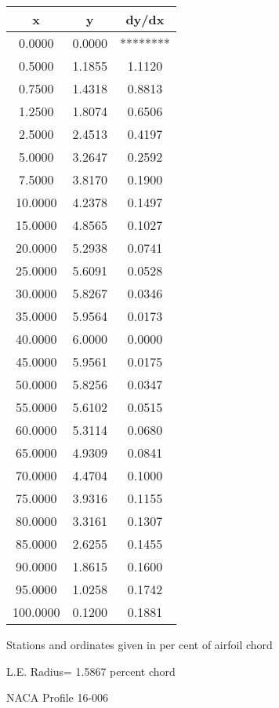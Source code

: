 \documentclass[11pt]{book}
\begin{document}
 \vspace{8mm}
 \begin{tabular}{|c|c|c|} \hline 
  x  &  y  &  dy/dx \\
 \hline
0.0000 & 0.0000 & ******** \\
0.5000 & 1.1855 & 1.1120 \\
0.7500 & 1.4318 & 0.8813 \\
1.2500 & 1.8074 & 0.6506 \\
2.5000 & 2.4513 & 0.4197 \\
5.0000 & 3.2647 & 0.2592 \\
7.5000 & 3.8170 & 0.1900 \\
10.0000 & 4.2378 & 0.1497 \\
15.0000 & 4.8565 & 0.1027 \\
20.0000 & 5.2938 & 0.0741 \\
25.0000 & 5.6091 & 0.0528 \\
30.0000 & 5.8267 & 0.0346 \\
35.0000 & 5.9564 & 0.0173 \\
40.0000 & 6.0000 & 0.0000 \\
45.0000 & 5.9561 & 0.0175 \\
50.0000 & 5.8256 & 0.0347 \\
55.0000 & 5.6102 & 0.0515 \\
60.0000 & 5.3114 & 0.0680 \\
65.0000 & 4.9309 & 0.0841 \\
70.0000 & 4.4704 & 0.1000 \\
75.0000 & 3.9316 & 0.1155 \\
80.0000 & 3.3161 & 0.1307 \\
85.0000 & 2.6255 & 0.1455 \\
90.0000 & 1.8615 & 0.1600 \\
95.0000 & 1.0258 & 0.1742 \\
100.0000 & 0.1200 & 0.1881 \\
 \hline
 \end{tabular}
 \vspace{8mm}


Stations and ordinates given in per cent of airfoil chord 


L.E. Radius=  1.5867 percent chord
 \newpage
  \label{p16-006}
 \begin{Large}
 NACA Profile 16-006
 \end{Large}
  
\end{document}
